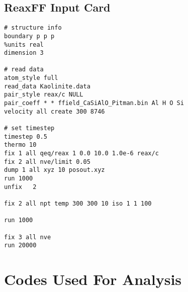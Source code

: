 \section{ReaxFF Input Card}
\label{appendix:reaxff}
\begin{singlespace}
\begin{verbatim}
# structure info
boundary p p p
%units real
dimension 3

# read data
atom_style full
read_data Kaolinite.data
pair_style reax/c NULL
pair_coeff * * ffield_CaSiAlO_Pitman.bin Al H O Si
velocity all create 300 8746

# set timestep
timestep 0.5
thermo 10
fix 1 all qeq/reax 1 0.0 10.0 1.0e-6 reax/c
fix 2 all nve/limit 0.05
dump 1 all xyz 10 posout.xyz
run 1000
unfix	2

fix 2 all npt temp 300 300 10 iso 1 1 100

run 1000

fix 3 all nve 
run 20000
\end{verbatim}
\end{singlespace}


\chapter{Codes Used For Analysis}

